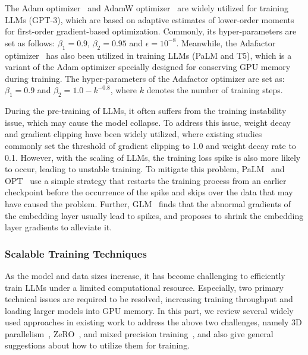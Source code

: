 {
The Adam optimizer~\cite{Kingma-arXiv-2015-Adam} and  {AdamW optimizer~\cite{Loshchilov-arxiv-2017-Fixing}} are widely utilized for training LLMs (\eg GPT-3), which are based on adaptive estimates of lower-order moments for first-order gradient-based optimization.
Commonly, its hyper-parameters are set as follows: $\beta_1 = 0.9$, $\beta_2 = 0.95$ and $\epsilon = 10^{-8}$.
Meanwhile, the Adafactor optimizer~\cite{Shazeer-ICML-2018-Adafactor} has also been utilized in training LLMs (\eg PaLM and T5), which is a variant of the Adam optimizer specially designed for conserving GPU memory during training.
The hyper-parameters of the Adafactor optimizer are set as: $\beta_1 = 0.9$ and $\beta_2 = 1.0 - k^{-0.8}$, where $k$ denotes the number of training steps.

During the pre-training of LLMs, it often suffers from the  training instability issue, which may cause the model collapse. 
To address this issue, weight decay and gradient clipping have been widely utilized, where existing studies~\cite{Brown-NeurIPS-2020-Language,Zhang-arxiv-2022-OPT,Scao-arxiv-2022-BLOOM,Smith-CoRR-2022-Using,Zeng-arxiv-2022-GLM}  commonly set the threshold of gradient clipping to 1.0 and weight decay rate to 0.1.  
However, with the scaling of LLMs, the training loss spike is also more likely to occur, leading to  unstable training. 
To mitigate this problem, PaLM~\cite{Chowdhery-arxiv-2022-PaLM} and OPT~\cite{Zhang-arxiv-2022-OPT} use a simple strategy that restarts the training process from an earlier checkpoint before the occurrence of the spike and skips over the data that may have caused the problem.
Further, GLM~\cite{Zeng-arxiv-2022-GLM} finds that the abnormal gradients of the embedding layer usually lead to spikes, and proposes  to shrink the embedding layer gradients to alleviate it.

\subsubsection{Scalable Training Techniques}
As  the model and data sizes increase, it has become challenging to efficiently train LLMs under a limited computational resource.  
Especially, two primary technical issues are required to be resolved, \ie increasing training throughput and loading larger models into GPU memory.
In this part, we review several widely used approaches in existing work to address the above two challenges, namely 
3D parallelism~\cite{Huang-NeurIPS-2019-GPipe,Harlap-arXiv-2018-PipeDream,Shoeybi-arXiv-2019-Megatron}, ZeRO~\cite{Rajbhandari-IEEE-2020-ZeRO}, and mixed precision training~\cite{Micikevicius-arXiv-2017-Mixed}, and also give general suggestions about how to utilize them for training. 

}
